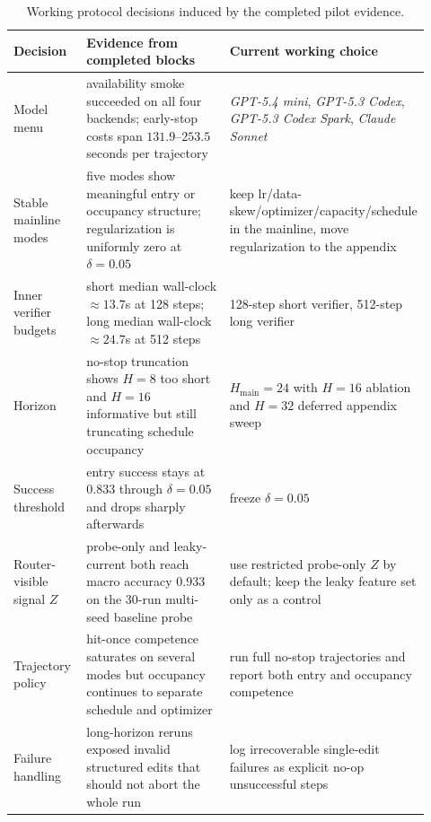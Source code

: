 \documentclass{article}
\begin{document}
\begin{table}[t]
\centering
\small
\caption{Working protocol decisions induced by the completed pilot evidence.}
\label{tab:freeze-decisions}
\begin{tabular}{@{}p{0.18\linewidth}p{0.43\linewidth}p{0.31\linewidth}@{}}
\toprule
Decision & Evidence from completed blocks & Current working choice \\
\midrule
Model menu & availability smoke succeeded on all four backends; early-stop costs span $131.9$--$253.5$ seconds per trajectory & \textit{GPT-5.4 mini}, \textit{GPT-5.3 Codex}, \textit{GPT-5.3 Codex Spark}, \textit{Claude Sonnet} \\
Stable mainline modes & five modes show meaningful entry or occupancy structure; regularization is uniformly zero at $\delta=0.05$ & keep lr/data-skew/optimizer/capacity/schedule in the mainline, move regularization to the appendix \\
Inner verifier budgets & short median wall-clock $\approx 13.7$s at 128 steps; long median wall-clock $\approx 24.7$s at 512 steps & 128-step short verifier, 512-step long verifier \\
Horizon & no-stop truncation shows $H=8$ too short and $H=16$ informative but still truncating schedule occupancy & $H_{\mathrm{main}}=24$ with $H=16$ ablation and $H=32$ deferred appendix sweep \\
Success threshold & entry success stays at $0.833$ through $\delta=0.05$ and drops sharply afterwards & freeze $\delta=0.05$ \\
Router-visible signal $Z$ & probe-only and leaky-current both reach macro accuracy $0.933$ on the 30-run multi-seed baseline probe & use restricted probe-only $Z$ by default; keep the leaky feature set only as a control \\
Trajectory policy & hit-once competence saturates on several modes but occupancy continues to separate schedule and optimizer & run full no-stop trajectories and report both entry and occupancy competence \\
Failure handling & long-horizon reruns exposed invalid structured edits that should not abort the whole run & log irrecoverable single-edit failures as explicit no-op unsuccessful steps \\
\bottomrule
\end{tabular}
\end{table}
\end{document}
